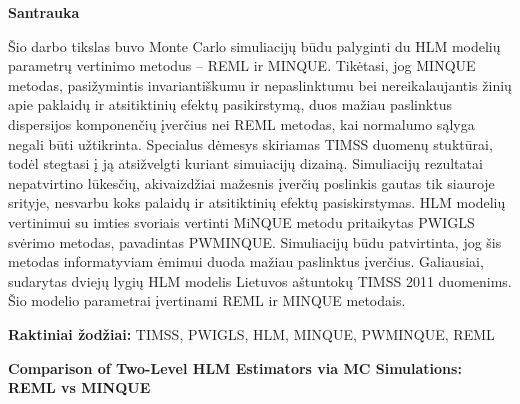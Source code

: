 \documentclass[11pt,a4paper]{article}
\begin{document}
\begin{small}
\vspace{2\baselineskip}
\begin{center}\textbf{Santrauka}\end{center}

\indent Šio darbo tikslas buvo Monte Carlo simuliacijų būdu palyginti du HLM modelių parametrų vertinimo metodus -- REML ir MINQUE. Tikėtasi, jog MINQUE metodas, pasižymintis invariantiškumu ir nepaslinktumu bei nereikalaujantis žinių apie paklaidų ir atsitiktinių efektų pasikirstymą, duos mažiau paslinktus dispersijos komponenčių įverčius nei REML metodas, kai normalumo sąlyga negali būti užtikrinta. Specialus dėmesys skiriamas TIMSS duomenų stuktūrai, todėl stegtasi į ją atsižvelgti kuriant simuiacijų dizainą. Simuliacijų rezultatai nepatvirtino lūkesčių, akivaizdžiai mažesnis įverčių poslinkis gautas tik siauroje srityje, nesvarbu koks palaidų ir atsitiktinių efektų pasiskirstymas. HLM modelių vertinimui su imties svoriais vertinti MiNQUE metodu pritaikytas PWIGLS svėrimo metodas, pavadintas PWMINQUE. Simuliacijų būdu patvirtinta, jog šis metodas informatyviam ėmimui duoda mažiau paslinktus įverčius. Galiausiai, sudarytas dviejų lygių HLM modelis Lietuvos aštuntokų TIMSS 2011 duomenims. Šio modelio parametrai įvertinami REML ir MINQUE metodais.

\vspace{\baselineskip}

\noindent\textbf{Raktiniai žodžiai:}
TIMSS, PWIGLS, HLM, MINQUE, PWMINQUE, REML
\end{small}
\vspace{\baselineskip}
\thispagestyle{empty}

\begin{center}{\large\textbf{Comparison of Two-Level HLM Estimators via MC Simulations: REML vs MINQUE}}\end{center}
\end{document}
